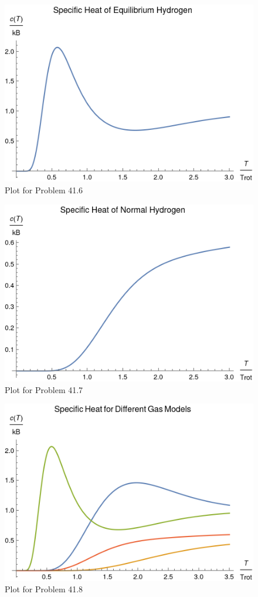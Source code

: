 \documentclass[a4paper,twoside]{article}
\begin{document}
\begin{figure}[h]
    \centering
    \includegraphics[width=\textwidth]{41_6.png}
    \caption{Plot for Problem 41.6}
    \label{fig:41_6}
\end{figure}
\begin{figure}[h]
    \centering
    \includegraphics[width=\textwidth]{41_7.png}
    \caption{Plot for Problem 41.7}
    \label{fig:41_7}
\end{figure}
\begin{figure}[h]
    \centering
    \includegraphics[width=\textwidth]{41_8.png}
    \caption{Plot for Problem 41.8}
    \label{fig:41_8}
\end{figure}
\end{document}
